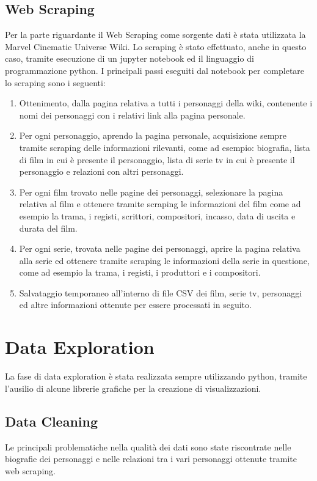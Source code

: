 \documentclass[
12pt, %
a4paper, %
oneside, %
headinclude,footinclude, %
BCOR5mm, %
]{scrartcl}
\begin{document}
\subsection{Web Scraping}
Per la parte riguardante il Web Scraping come sorgente dati è stata utilizzata la Marvel Cinematic Universe Wiki. \cite{linkFandom}
Lo scraping è stato effettuato, anche in questo caso, tramite esecuzione di un jupyter notebook ed il linguaggio di programmazione python.
I principali passi eseguiti dal notebook per completare lo scraping sono i seguenti:
\begin{enumerate}
\item Ottenimento, dalla pagina relativa a tutti i personaggi della wiki, contenente i nomi dei personaggi con i relativi link alla pagina personale. 
\item Per ogni personaggio, aprendo la pagina personale, acquisizione sempre tramite scraping delle informazioni rilevanti, come ad esempio: biografia, lista di film in cui è presente il personaggio, lista di serie tv in cui è presente il personaggio e relazioni con altri personaggi.
\item Per ogni film trovato nelle pagine dei personaggi, selezionare la pagina relativa al film e ottenere tramite scraping le informazioni del film come ad esempio la trama, i registi, scrittori, compositori, incasso, data di uscita e durata del film.
\item Per ogni serie, trovata nelle pagine dei personaggi, aprire la pagina relativa alla serie ed ottenere tramite scraping le informazioni della serie in questione, come ad esempio la trama, i registi, i produttori e i compositori.
\item Salvataggio temporaneo all'interno di file CSV dei film, serie tv, personaggi ed altre informazioni ottenute per essere processati in seguito.
\end{enumerate}

\section{Data Exploration}
La fase di data exploration è stata realizzata sempre utilizzando python, tramite l'ausilio di alcune librerie grafiche per la creazione di visualizzazioni.

\subsection{Data Cleaning}
Le principali problematiche nella qualità dei dati sono state riscontrate nelle biografie dei personaggi e nelle relazioni tra i vari personaggi ottenute tramite web scraping.
\end{document}
